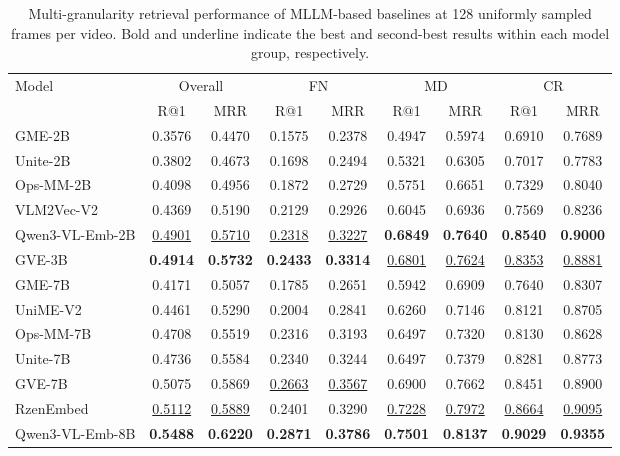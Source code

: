 \begin{table}[t]
    \centering
    \caption{Multi-granularity retrieval performance of MLLM-based baselines at 128 uniformly sampled frames per video. Bold and underline indicate the best and second-best results within each model group, respectively.}
    \label{mglvr:tab:main_results_128f}
    \setlength{\tabcolsep}{2pt}
    \begin{tabular}{@{}l*{8}{c}@{}}
\toprule
Model & \multicolumn{2}{c|}{Overall} & \multicolumn{2}{c|}{FN} & \multicolumn{2}{c|}{MD} & \multicolumn{2}{c}{CR} \\
      & R@1   & MRR   & R@1   & MRR   & R@1   & MRR   & R@1   & MRR \\
\midrule
GME-2B                  & 0.3576 & 0.4470 & 0.1575 & 0.2378 & 0.4947 & 0.5974 & 0.6910 & 0.7689 \\
Unite-2B                & 0.3802 & 0.4673 & 0.1698 & 0.2494 & 0.5321 & 0.6305 & 0.7017 & 0.7783 \\
Ops-MM-2B               & 0.4098 & 0.4956 & 0.1872 & 0.2729 & 0.5751 & 0.6651 & 0.7329 & 0.8040 \\
VLM2Vec-V2              & 0.4369 & 0.5190 & 0.2129 & 0.2926 & 0.6045 & 0.6936 & 0.7569 & 0.8236 \\
Qwen3-VL-Emb-2B         & \underline{0.4901} & \underline{0.5710} & \underline{0.2318} & \underline{0.3227} & \textbf{0.6849} & \textbf{0.7640} & \textbf{0.8540} & \textbf{0.9000} \\
GVE-3B                  & \textbf{0.4914} & \textbf{0.5732} & \textbf{0.2433} & \textbf{0.3314} & \underline{0.6801} & \underline{0.7624} & \underline{0.8353} & \underline{0.8881} \\
\midrule
GME-7B                  & 0.4171 & 0.5057 & 0.1785 & 0.2651 & 0.5942 & 0.6909 & 0.7640 & 0.8307 \\
UniME-V2                & 0.4461 & 0.5290 & 0.2004 & 0.2841 & 0.6260 & 0.7146 & 0.8121 & 0.8705 \\
Ops-MM-7B               & 0.4708 & 0.5519 & 0.2316 & 0.3193 & 0.6497 & 0.7320 & 0.8130 & 0.8628 \\
Unite-7B                & 0.4736 & 0.5584 & 0.2340 & 0.3244 & 0.6497 & 0.7379 & 0.8281 & 0.8773 \\
GVE-7B                  & 0.5075 & 0.5869 & \underline{0.2663} & \underline{0.3567} & 0.6900 & 0.7662 & 0.8451 & 0.8900 \\
RzenEmbed               & \underline{0.5112} & \underline{0.5889} & 0.2401 & 0.3290 & \underline{0.7228} & \underline{0.7972} & \underline{0.8664} & \underline{0.9095} \\
Qwen3-VL-Emb-8B         & \textbf{0.5488} & \textbf{0.6220} & \textbf{0.2871} & \textbf{0.3786} & \textbf{0.7501} & \textbf{0.8137} & \textbf{0.9029} & \textbf{0.9355} \\
\bottomrule
\end{tabular}
\end{table}


